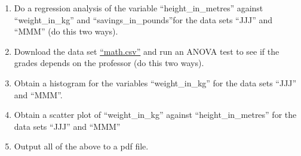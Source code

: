 \documentclass[12pt]{article}
\begin{document}
\begin{enumerate}
\item Do a regression analysis of the variable ``height\_in\_metres'' against ``weight\_in\_kg'' and ``savings\_in\_pounds''for the data sets ``JJJ'' and ``MMM'' (do this two ways).
\item Download the data set \href{https://docs.google.com/file/d/0Bx_zrw5uAafbQ1ZJOUJxdGtYb1U/edit}{``math.csv''} and run an ANOVA test to see if the grades depends on the professor (do this two ways).
\item Obtain a histogram for the variables ``weight\_in\_kg'' for the data sets ``JJJ'' and ``MMM''.
\item Obtain a scatter plot of ``weight\_in\_kg'' against ``height\_in\_metres'' for the data sets ``JJJ'' and ``MMM''
\item Output all of the above to a pdf file.
\end{enumerate}
\end{document}
